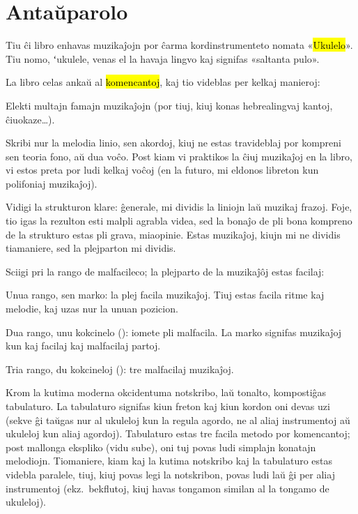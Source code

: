 \section*{Antaŭparolo}

Tiu ĉi libro enhavas muzikaĵojn por ĉarma kordinstrumenteto nomata «\hl{Ukulelo}». Tiu nomo, {ʻ}ukulele, venas el la havaja lingvo kaj signifas «saltanta pulo».

La libro celas ankaŭ al \hl{komencantoj}, kaj tio videblas per kelkaj manieroj: 
\begin{compactitem}
	\item Elekti multajn famajn muzikaĵojn (por tiuj, kiuj konas hebrealingvaj kantoj, ĉiuokaze…).
	\item Skribi nur la melodia linio, sen akordoj, kiuj ne estas travideblaj por kompreni sen teoria fono, aŭ dua voĉo. Post kiam vi praktikos la ĉiuj muzikaĵoj en la libro, vi estos preta por ludi kelkaj voĉoj (en la futuro, mi eldonos libreton kun polifoniaj muzikaĵoj).
	\item Vidigi la strukturon klare: ĝenerale, mi dividis la liniojn laŭ muzikaj frazoj. Foje, tio igas la rezulton esti malpli agrabla videa, sed la bonaĵo de pli bona kompreno de la strukturo estas pli grava, miaopinie. Estas muzikaĵoj, kiujn mi ne dividis tiamaniere, sed la plejparton mi dividis.
	\item Sciigi pri la rango de malfacileco; la plejparto de la muzikaĵôj estas facilaj: 
		\begin{compactitem}
			\item Unua rango, sen marko: la plej facila muzikaĵoj. Tiuj estas facila ritme kaj melodie, kaj uzas nur la unuan pozicion.
			\item Dua rango, unu kokcinelo (\rangoB): iomete pli malfacila. La marko {\rangoAB} signifas muzikaĵoj kun kaj facilaj kaj malfacilaj partoj.
			\item Tria rango, du kokcineloj (\rangoC): tre malfacilaj muzikaĵoj.
		\end{compactitem}
	\item Krom la kutima moderna okcidentuma notskribo, laŭ tonalto, kompostiĝas tabulaturo. La tabulaturo signifas kiun freton kaj kiun kordon oni devas uzi (sekve ĝi taŭgas nur al ukuleloj kun la regula agordo, ne al aliaj instrumentoj aŭ ukuleloj kun aliaj agordoj). Tabulaturo estas tre facila metodo por komencantoj; post mallonga ekspliko (vidu sube), oni tuj povas ludi simplajn konatajn melodiojn. Tiomaniere, kiam kaj la kutima notskribo kaj la tabulaturo estas videbla paralele, tiuj, kiuj povas legi la notskribon, povas ludi laŭ ĝi per aliaj instrumentoj (ekz.\ bekflutoj, kiuj havas tongamon similan al la tongamo de ukuleloj).
\end{compactitem}


